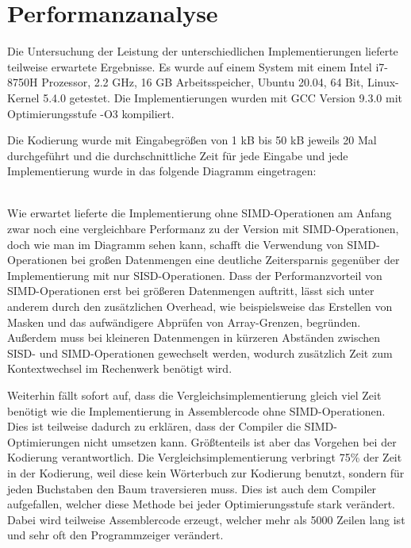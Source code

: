 \documentclass[course=erap]{aspdoc}
\begin{document}
\section{Performanzanalyse}
\label{performanzAnalyse}
Die Untersuchung der Leistung der unterschiedlichen Implementierungen lieferte teilweise erwartete Ergebnisse. Es wurde auf einem System mit einem Intel i7-8750H Prozessor, 2.2 GHz, 16 GB Arbeitsspeicher, Ubuntu 20.04, 64 Bit, Linux-Kernel 5.4.0 getestet. Die Implementierungen wurden mit GCC Version 9.3.0 mit Optimierungsstufe -O3 kompiliert.

Die Kodierung wurde mit Eingabegrößen von 1 kB bis 50 kB jeweils 20 Mal durchgeführt und die durchschnittliche Zeit für jede Eingabe und jede Implementierung wurde in das folgende Diagramm eingetragen:\\
\begin{figure}[!h]
\centering
{}
\end{figure}
\\
Wie erwartet lieferte die Implementierung ohne SIMD-Operationen am Anfang zwar noch eine vergleichbare Performanz zu der Version mit SIMD-Operationen, doch wie man im Diagramm sehen kann, schafft die Verwendung von SIMD-Operationen bei großen Datenmengen eine deutliche Zeitersparnis gegenüber der Implementierung mit nur SISD-Operationen. Dass der Performanzvorteil von SIMD-Operationen erst bei größeren Datenmengen auftritt, lässt sich unter anderem durch den zusätzlichen Overhead, wie beispielsweise das Erstellen von Masken und das aufwändigere Abprüfen von Array-Grenzen, begründen. Außerdem muss bei kleineren Datenmengen in kürzeren Abständen zwischen SISD- und SIMD-Operationen gewechselt werden, wodurch zusätzlich Zeit zum Kontextwechsel im Rechenwerk benötigt wird.

Weiterhin fällt sofort auf, dass die Vergleichsimplementierung gleich viel Zeit benötigt wie die Implementierung in Assemblercode ohne SIMD-Operationen. Dies ist teilweise dadurch zu erklären, dass der Compiler die SIMD-Optimierungen nicht umsetzen kann. Größtenteils ist aber das Vorgehen bei der Kodierung verantwortlich. Die Vergleichsimplementierung verbringt 75\% der Zeit in der Kodierung, weil diese kein Wörterbuch zur Kodierung benutzt, sondern für jeden Buchstaben den Baum traversieren muss. Dies ist auch dem Compiler aufgefallen, welcher diese Methode bei jeder Optimierungsstufe stark verändert. Dabei wird teilweise Assemblercode erzeugt, welcher mehr als 5000 Zeilen lang ist und sehr oft den Programmzeiger verändert.
\end{document}
